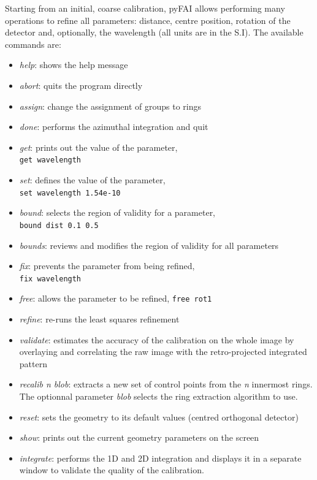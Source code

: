 \documentclass{iucr}
\begin{document}
Starting from an initial, coarse calibration, pyFAI allows performing many
operations to refine all parameters: distance, centre position, rotation of
the detector and, optionally, the wavelength (all units are in the S.I).
The available commands are:
\begin{itemize}
\item \textit{help}: shows the help message
\item \textit{abort}: quits the program directly
\item \textit{assign}: change the assignment of groups to rings
\item \textit{done}: performs the azimuthal integration and quit
\item \textit{get}: prints out the value of the parameter, \\
	\verb|get wavelength|
\item \textit{set}: defines the value of the parameter,\\
	\verb|set wavelength 1.54e-10|
\item \textit{bound}: selects the region of validity for a parameter,\\
	\verb|bound dist 0.1 0.5|
\item \textit{bounds}: reviews and modifies the region of validity for all
parameters
\item \textit{fix}: prevents the parameter from being refined,\\
	\verb|fix wavelength|
\item \textit{free}: allows the parameter to be refined, 
	\verb|free rot1|
\item \textit{refine}: re-runs the least squares refinement
\item \textit{validate}: estimates the accuracy of the calibration on
the whole image by overlaying and correlating the raw image with the
retro-projected integrated pattern
\item \textit{recalib n blob}: extracts a new set of control points from the
\textit{n} innermost rings. The optionnal parameter \textit{blob}
selects the ring extraction algorithm to use.
\item \textit{reset}: sets the geometry to its default values (centred
orthogonal detector)
\item \textit{show}: prints out the current geometry parameters on the screen
\item \textit{integrate}: performs the 1D and 2D integration and displays it in
a separate window to validate the quality of the calibration.
\end{itemize}
\end{document}
